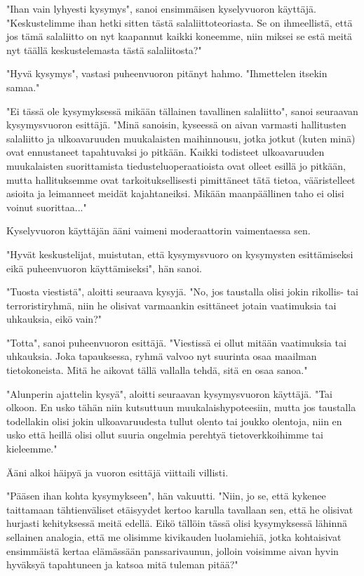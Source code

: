 "Ihan vain lyhyesti kysymys", sanoi ensimmäisen kyselyvuoron käyttäjä. "Keskustelimme ihan hetki sitten tästä salaliittoteoriasta. Se on ihmeellistä, että jos tämä salaliitto on nyt kaapannut kaikki koneemme, niin miksei se estä meitä nyt täällä keskustelemasta tästä salaliitosta?"


"Hyvä kysymys", vastasi puheenvuoron pitänyt hahmo. "Ihmettelen itsekin samaa."


"Ei tässä ole kysymyksessä mikään tällainen tavallinen salaliitto", sanoi seuraavan kysymysvuoron esittäjä. "Minä sanoisin, kyseessä on aivan varmasti hallitusten salaliitto ja ulkoavaruuden muukalaisten maihinnousu, jotka jotkut (kuten minä) ovat ennustaneet tapahtuvaksi jo pitkään. Kaikki todisteet ulkoavaruuden muukalaisten suorittamista tiedusteluoperaatioista ovat olleet esillä jo pitkään, mutta hallituksemme ovat tarkoituksellisesti pimittäneet tätä tietoa, vääristelleet asioita ja leimanneet meidät kajahtaneiksi. Mikään maanpäällinen taho ei olisi voinut suorittaa..."


Kyselyvuoron käyttäjän ääni vaimeni moderaattorin vaimentaessa sen.


"Hyvät keskustelijat, muistutan, että kysymysvuoro on kysymysten esittämiseksi eikä puheenvuoron käyttämiseksi", hän sanoi.


"Tuosta viestistä", aloitti seuraava kysyjä. "No, jos taustalla olisi jokin rikollis- tai terroristiryhmä, niin he olisivat varmaankin esittäneet jotain vaatimuksia tai uhkauksia, eikö vain?"


"Totta", sanoi puheenvuoron esittäjä. "Viestissä ei ollut mitään vaatimuksia tai uhkauksia. Joka tapauksessa, ryhmä valvoo nyt suurinta osaa maailman tietokoneista. Mitä he aikovat tällä vallalla tehdä, sitä en osaa sanoa."


"Alunperin ajattelin kysyä", aloitti seuraavan kysymysvuoron käyttäjä. "Tai olkoon. En usko tähän niin kutsuttuun muukalaishypoteesiin, mutta jos taustalla todellakin olisi jokin ulkoavaruudesta tullut olento tai joukko olentoja, niin en usko että heillä olisi ollut suuria ongelmia perehtyä tietoverkkoihimme tai kieleemme."


Ääni alkoi häipyä ja vuoron esittäjä viittaili villisti.


"Pääsen ihan kohta kysymykseen", hän vakuutti. "Niin, jo se, että kykenee taittamaan tähtienväliset etäisyydet kertoo karulla tavallaan sen, että he olisivat hurjasti kehityksessä meitä edellä. Eikö tällöin tässä olisi kysymyksessä lähinnä sellainen analogia, että me olisimme kivikauden luolamiehiä, jotka kohtaisivat ensimmäistä kertaa elämässään panssarivaunun, jolloin voisimme aivan hyvin hyväksyä tapahtuneen ja katsoa mitä tuleman pitää?"


